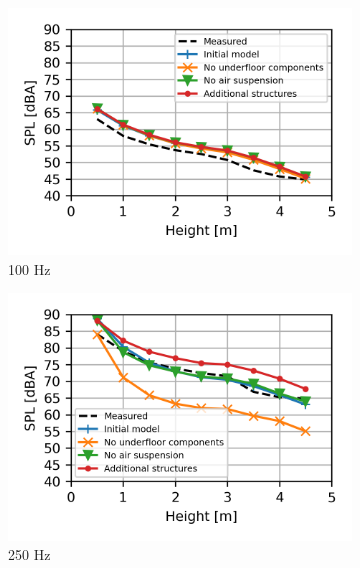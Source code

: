 \begin{figure}[H]
	\centering
	\begin{subfigure}[b]{0.49\textwidth}
		\centering
		\includegraphics{fig/chap5/geometry_variation/third_octave_over_height/100_Hz.png}
		\caption{100 Hz}
	\end{subfigure}
	\begin{subfigure}[b]{0.49\textwidth}
		\centering
		\includegraphics{fig/chap5/geometry_variation/third_octave_over_height/250_Hz.png}
		\caption{250 Hz}
	\end{subfigure}
	\begin{subfigure}[b]{0.49\textwidth}
		\centering

\end{subfigure}
\end{figure}
